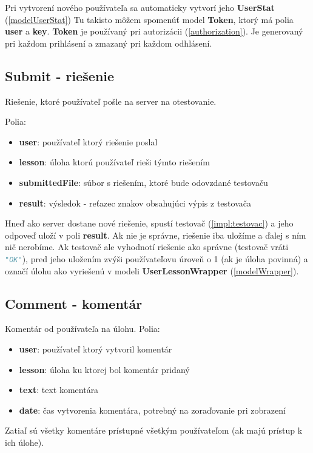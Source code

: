 Pri vytvorení nového používateľa sa automaticky vytvorí jeho \textbf{UserStat} (\ref{modelUserStat})
\newline
Tu takisto môžem spomenúť model \textbf{Token}, ktorý má polia \textbf{user} a \textbf{key}.
\textbf{Token} je používaný pri autorizácii (\ref{authorization}). Je generovaný
pri každom prihlásení a zmazaný pri každom odhlásení.
\newpage
\subsection{Submit - riešenie}
Riešenie, ktoré používateľ pošle na server na otestovanie.

Polia:
\begin{itemize}
\item \textbf{user}: používateľ ktorý riešenie poslal
\item \textbf{lesson}: úloha ktorú používateľ rieši týmto riešením
\item \textbf{submittedFile}: súbor s riešením, ktoré bude odovzdané testovaču
\item \textbf{result}: výsledok - reťazec znakov obsahujúci výpis z testovača
\end{itemize}

Hneď ako server dostane nové riešenie, spustí testovač (\ref{impl:testovac}) a jeho odpoveď uloží v poli
\textbf{result}. Ak nie je správne, riešenie iba uložíme a ďalej s ním nič nerobíme.
Ak testovač ale vyhodnotí riešenie ako správne (testovač vráti \lstinline[language=Python]{"OK"}), pred jeho uložením zvýši používateľovu
úroveň o 1 (ak je úloha povinná) a označí úlohu ako vyriešenú v modeli \textbf{UserLessonWrapper} (\ref{modelWrapper}).

\subsection{Comment - komentár}
Komentár od používateľa na úlohu.
Polia:
\begin{itemize}
\item \textbf{user}: používateľ ktorý vytvoril komentár
\item \textbf{lesson}: úloha ku ktorej bol komentár pridaný
\item \textbf{text}: text komentára
\item \textbf{date}: čas vytvorenia komentára, potrebný na zoraďovanie pri zobrazení
\end{itemize}

Zatiaľ sú všetky komentáre prístupné všetkým používateľom (ak majú prístup k ich úlohe).

